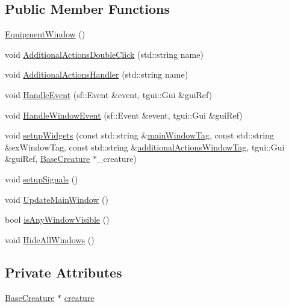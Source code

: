 \subsection*{Public Member Functions}
\begin{DoxyCompactItemize}
\item 
\mbox{\hyperlink{class_equipment_window_ae2fd493944d97be1e7ac583f3ce3972c}{Equipment\+Window}} ()
\item 
void \mbox{\hyperlink{class_equipment_window_abfd5a25ea90203e21291d6c6725b30f2}{Additional\+Actions\+Double\+Click}} (std\+::string name)
\item 
void \mbox{\hyperlink{class_equipment_window_aa97046abad40cd1b4003fef694686992}{Additional\+Actions\+Handler}} (std\+::string name)
\item 
void \mbox{\hyperlink{class_equipment_window_aea251bbf9967a0f39ccca5df854adcbe}{Handle\+Event}} (sf\+::\+Event \&event, tgui\+::\+Gui \&gui\+Ref)
\item 
void \mbox{\hyperlink{class_equipment_window_a51ce202b7d1c4ac4e0e7d93df9dec726}{Handle\+Window\+Event}} (sf\+::\+Event \&event, tgui\+::\+Gui \&gui\+Ref)
\item 
void \mbox{\hyperlink{class_equipment_window_ad6ac175768f8725534c9b9ca1bd4d79a}{setup\+Widgets}} (const std\+::string \&\mbox{\hyperlink{class_selection_window_a555e8cf723b237c5a2bef0f190e03c76}{main\+Window\+Tag}}, const std\+::string \&ex\+Window\+Tag, const std\+::string \&\mbox{\hyperlink{class_selection_window_ae21c9fb80565153e0dc21b30f42e5db3}{additional\+Actions\+Window\+Tag}}, tgui\+::\+Gui \&gui\+Ref, \mbox{\hyperlink{class_base_creature}{Base\+Creature}} $\ast$\+\_\+creature)
\item 
void \mbox{\hyperlink{class_equipment_window_ae0c437e74fb9e01a5fb0423df76e4665}{setup\+Signals}} ()
\item 
void \mbox{\hyperlink{class_equipment_window_acf7d2c5609224291b20ad65d1241eeca}{Update\+Main\+Window}} ()
\item 
bool \mbox{\hyperlink{class_equipment_window_a8d311134213a637a7de2d9a3885c716c}{is\+Any\+Window\+Visible}} ()
\item 
void \mbox{\hyperlink{class_equipment_window_a9ff317935c0c7698a4cde661348ad059}{Hide\+All\+Windows}} ()
\end{DoxyCompactItemize}
\subsection*{Private Attributes}
\begin{DoxyCompactItemize}
\item 
\mbox{\hyperlink{class_base_creature}{Base\+Creature}} $\ast$ \mbox{\hyperlink{class_equipment_window_aa4e082610d80b8270a932220ae90c5c5}{creature}}
\end{DoxyCompactItemize}
